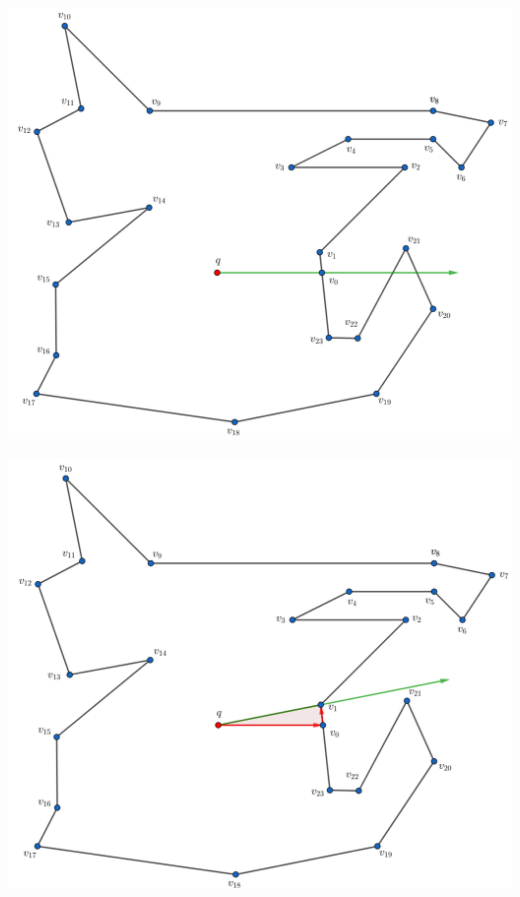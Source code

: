\begin{frame}
  \centering \includegraphics[width=0.70 \paperwidth]{images/Ejecucion/e02.png}
\end{frame}

\begin{frame}
  \centering \includegraphics[width=0.70 \paperwidth]{images/Ejecucion/e03.png}
\end{frame}

